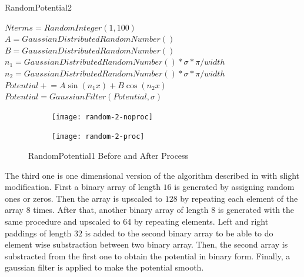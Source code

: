 \documentclass[a4paper,times,hidelinks,12pt]{article}
\begin{document}
\begin{algorithm}[H]
    \caption{RandomPotential2}\label{euclid}
    \begin{algorithmic}[1]
        \State $ Nterms = RandomInteger(1, 100)$
        \State $A = GaussianDistributedRandomNumber()$
        \State $B = GaussianDistributedRandomNumber()$
        \State $n_1 = GaussianDistributedRandomNumber() * \sigma*\pi / width  $
        \State $n_2 = GaussianDistributedRandomNumber() * \sigma*\pi / width  $
        \State $Potential \mathrel{+}= A\sin(n_1 x) + B\cos(n_2 x)$
        \EndFor
        \State $Potential = GaussianFilter(Potential, \sigma)$ 
    \EndProcedure
    \end{algorithmic}
\label{alg:random_potential_1}
\end{algorithm}

\graphicspath{{"../figs/potentials/"}}
\begin{figure}[H]
    \centering
    \begin{subfigure}[t]{0.45\textwidth}
        \texttt{[image: random-2-noproc]}
		
    \end{subfigure}
    \begin{subfigure}[t]{0.45\textwidth}
        \texttt{[image: random-2-proc]}
		
    \end{subfigure}
\caption{RandomPotential1 Before and After Process}
\label{fig:random2_before_after}
\end{figure}

The third one is one dimensional version of the algorithm described in \cite{mills2017deep} with slight modification. First a binary array of length $16$ is generated by assigning random ones or zeros. Then the array is upscaled to $128$ by repeating each element of the array $8$ times. After that, another binary array of length $8$ is generated with the same procedure and upscaled to $64$ by repeating elements. Left and right paddings of length $32$ is added to the second binary array to be able to do element wise substraction between two binary array. Then, the second array is substracted from the first one to obtain the potential in binary form. Finally, a gaussian filter is applied to make the potential smooth. 
\end{document}
